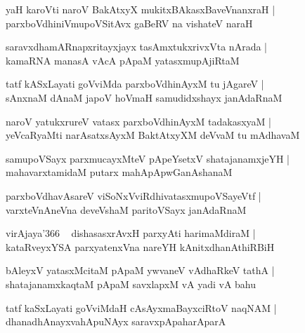 \documentclass[twoside,12pt,openright]{book}
\newcounter{shloka}[chapter]
\begin{document}
\begin{shloka}%
yaH karoVti naroV BakAtxyX mukitxBAkasxBaveVnanxraH |\\
parxboVdhiniVmupoVSitAvx gaBeRV na vishateV naraH 
\end{shloka}

\begin{shloka}%
saravxdhamARnapxritayxjayx tasAmxtukxrivxVta nArada |\\
kamaRNA manasA vAcA pApaM yatasxmupAjiRtaM 
\end{shloka}

\begin{shloka}%
tatf kASxLayati goVviMda parxboVdhinAyxM tu jAgareV |\\
sAnxnaM dAnaM japoV hoVmaH samudidxshayx janAdaRnaM 
\end{shloka}

\begin{shloka}%
naroV yatukxrureV vatasx parxboVdhinAyxM tadakasxyaM |\\
yeVcaRyaMti narAsatxsAyxM BaktAtxyXM deVvaM tu mAdhavaM 
\end{shloka}

\begin{shloka}%
samupoVSayx parxmucayxMteV pApeYsetxV shatajanamxjeYH |\\
mahavarxtamidaM putarx mahApApwGanAshanaM 
\end{shloka}

\begin{shloka}%
parxboVdhavAsareV viSoNxVviRdhivatasxmupoVSayeVtf |\\
varxteVnAneVna deveVshaM paritoVSayx janAdaRnaM 
\end{shloka}

\begin{shloka}%
virAjaya\char'366 ~ dishasasxrAvxH parxyAti harimaMdiraM |\\
kataRveyxYSA parxyatenxVna nareYH kAnitxdhanAthiRBiH
\end{shloka}

\begin{shloka}%
bAleyxV yatasxMcitaM pApaM ywvaneV vAdhaRkeV tathA |\\
shatajanamxkaqtaM pApaM savxlapxM vA yadi vA bahu
\end{shloka}

\begin{shloka}%
tatf kaSxLayati goVviMdaH cAsAyxmaBayxciRtoV naqNAM |\\
dhanadhAnayxvahApuNAyx saravxpApaharAparA
\end{shloka}
\end{document}

